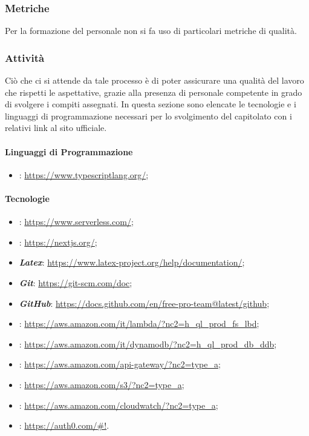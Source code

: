 \subsubsection{Metriche}
Per la formazione del personale non si fa uso di particolari metriche di qualità.

\subsubsection{Attività}
Ciò che ci si attende da tale processo è di poter assicurare una qualità del lavoro che
rispetti le aspettative, grazie alla presenza di personale competente in grado di
svolgere i compiti assegnati. In questa sezione sono elencate le tecnologie e i linguaggi di programmazione necessari per lo svolgimento del capitolato con i relativi link al sito ufficiale.

\paragraph{Linguaggi di Programmazione}
\begin{itemize}
    \item \textbf{}: \url{https://www.typescriptlang.org/};
\end{itemize}
\paragraph{Tecnologie}
\begin{itemize}
    \item \textbf{}: \url{https://www.serverless.com/};
    \item \textbf{}: \url{https://nextjs.org/};
    \item \textbf{\textit{Latex}}: \url{https://www.latex-project.org/help/documentation/};
    \item \textbf{\textit{Git}}: \url{https://git-scm.com/doc};
    \item \textbf{\textit{GitHub}}: \url{https://docs.github.com/en/free-pro-team@latest/github};
    \item \textbf{}: \url{https://aws.amazon.com/it/lambda/?nc2=h_ql_prod_fs_lbd};
    \item \textbf{}: \url{https://aws.amazon.com/it/dynamodb/?nc2=h_ql_prod_db_ddb};
    \item \textbf{}: \url{https://aws.amazon.com/api-gateway/?nc2=type_a};
    \item \textbf{}: \url{https://aws.amazon.com/s3/?nc2=type_a};
    \item \textbf{}: \url{https://aws.amazon.com/cloudwatch/?nc2=type_a};
    \item \textbf{}: \url{https://auth0.com/#!}.
\end{itemize}
